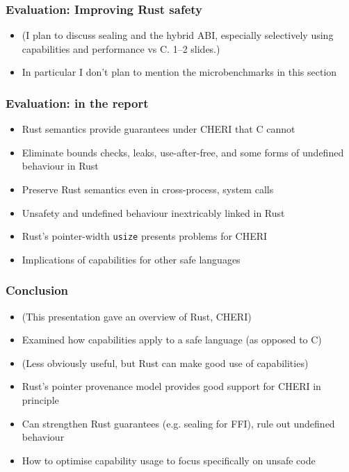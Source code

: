 \documentclass{beamer}
\begin{document}
\begin{frame}
\frametitle{Evaluation: Improving Rust safety}

\begin{itemize}
    \item (I plan to discuss sealing and the hybrid ABI, especially
    selectively using capabilities and performance vs C. 1--2 slides.)
    \item In particular I don't plan to mention the microbenchmarks in
    this section
\end{itemize}
\end{frame}


\begin{frame}
\frametitle{Evaluation: in the report}

\begin{itemize}
    \item Rust semantics provide guarantees under CHERI that C cannot
    \item Eliminate bounds checks, leaks, use-after-free, and some forms
    of undefined behaviour in Rust
    \item Preserve Rust semantics even in cross-process, system calls
    \item Unsafety and undefined behaviour inextricably linked in Rust
    \item Rust's pointer-width \texttt{usize} presents problems for CHERI
    \item Implications of capabilities for other safe languages
\end{itemize}
\end{frame}


\begin{frame}
\frametitle{Conclusion}

\begin{itemize}
    \item (This presentation gave an overview of Rust, CHERI)
    \item Examined how capabilities apply to a safe language (as opposed
    to C)
    \item (Less obviously useful, but Rust can make good use of capabilities)
    \item Rust's pointer provenance model provides good support for
    CHERI in principle
    \item Can strengthen Rust guarantees (e.g. sealing for FFI), rule out undefined behaviour
    \item How to optimise capability usage to focus specifically on unsafe code
\end{itemize}
\end{frame}
\end{document}
